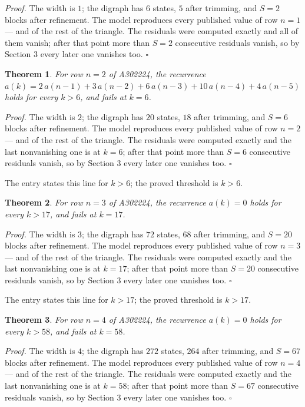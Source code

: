 \documentclass[11pt]{article}
\newtheorem{theorem}{Theorem}
\theoremstyle{definition}
\begin{document}
{\itshape Proof.} The width is $1$; the digraph has $6$ states, $5$ after trimming, and $S = 2$ blocks after refinement. The model reproduces every published value of row $n = 1$ --- and of the rest of the triangle. The residuals were computed exactly and all of them vanish; after that point more than $S = 2$ consecutive residuals vanish, so by Section 3 every later one vanishes too. $\square$

\begin{theorem} For row $n = 2$ of A302224, the recurrence $a(k) = 2\,a(n-1) + 3\,a(n-2) + 6\,a(n-3) + 10\,a(n-4) + 4\,a(n-5)$ holds for every $k > 6$, and fails at $k = 6$.\end{theorem}

{\itshape Proof.} The width is $2$; the digraph has $20$ states, $18$ after trimming, and $S = 6$ blocks after refinement. The model reproduces every published value of row $n = 2$ --- and of the rest of the triangle. The residuals were computed exactly and the last nonvanishing one is at $k = 6$; after that point more than $S = 6$ consecutive residuals vanish, so by Section 3 every later one vanishes too. $\square$

The entry states this line for $k > 6$; the proved threshold is $k > 6$.

\begin{theorem} For row $n = 3$ of A302224, the recurrence $a(k) = 0$ holds for every $k > 17$, and fails at $k = 17$.\end{theorem}

{\itshape Proof.} The width is $3$; the digraph has $72$ states, $68$ after trimming, and $S = 20$ blocks after refinement. The model reproduces every published value of row $n = 3$ --- and of the rest of the triangle. The residuals were computed exactly and the last nonvanishing one is at $k = 17$; after that point more than $S = 20$ consecutive residuals vanish, so by Section 3 every later one vanishes too. $\square$

The entry states this line for $k > 17$; the proved threshold is $k > 17$.

\begin{theorem} For row $n = 4$ of A302224, the recurrence $a(k) = 0$ holds for every $k > 58$, and fails at $k = 58$.\end{theorem}

{\itshape Proof.} The width is $4$; the digraph has $272$ states, $264$ after trimming, and $S = 67$ blocks after refinement. The model reproduces every published value of row $n = 4$ --- and of the rest of the triangle. The residuals were computed exactly and the last nonvanishing one is at $k = 58$; after that point more than $S = 67$ consecutive residuals vanish, so by Section 3 every later one vanishes too. $\square$
\end{document}
